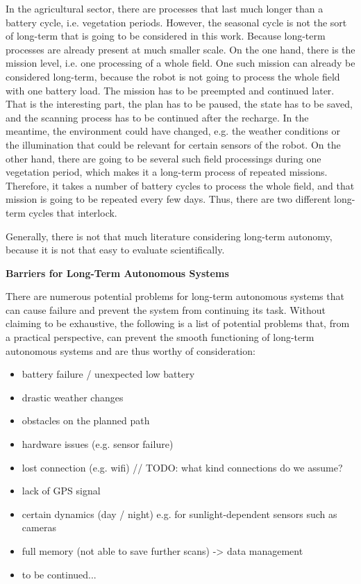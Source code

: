 \documentclass[german, master, expose, latin1]{base/thesis_KBS}
\begin{document}
In the agricultural sector, there are processes that last much longer than a battery cycle, i.e. vegetation periods.
However, the seasonal cycle is not the sort of long-term that is going to be considered in this work. Because long-term processes are already present at much smaller scale.
On the one hand, there is the mission level, i.e. one processing of a whole field. One such mission can already be considered long-term, because the robot is not 
going to process the whole field with one battery load. The mission has to be preempted and continued later. That is the interesting part, the plan has to be paused,
the state has to be saved, and the scanning process has to be continued after the recharge. In the meantime, the environment could have changed, e.g. the weather conditions
or the illumination that could be relevant for certain sensors of the robot. On the other hand, there are going to be several such field processings during one vegetation
period, which makes it a long-term process of repeated missions. Therefore, it takes a number of battery cycles to process the whole field, and that mission is going to be
repeated every few days. Thus, there are two different long-term cycles that interlock.

Generally, there is not that much literature considering long-term autonomy, because it is not that easy to evaluate scientifically.\newline

\pagebreak

\textbf{Barriers for Long-Term Autonomous Systems}\newline

There are numerous potential problems for long-term autonomous systems that can cause failure and prevent the system from continuing its task.
Without claiming to be exhaustive, the following is a list of potential problems that, from a practical perspective, can prevent the smooth functioning
of long-term autonomous systems and are thus worthy of consideration:
\begin{itemize}
    \item battery failure / unexpected low battery
    \item drastic weather changes
    \item obstacles on the planned path
    \item hardware issues (e.g. sensor failure)
    \item lost connection (e.g. wifi) // TODO: what kind connections do we assume?
    \item lack of GPS signal
    \item certain dynamics (day / night) e.g. for sunlight-dependent sensors such as cameras
    \item full memory (not able to save further scans) -> data management
    \item to be continued...
\end{itemize}
\end{document}
